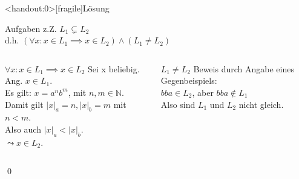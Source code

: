{
\begin{frame}<handout:0>[fragile]{Lösung}
    \begin{alertblock}{Aufgaben}
    z.Z. $L_1 \subsetneq L_2$\\
    d.h. $(\forall x: x \in L_1 \implies x \in L_2) \wedge (L_1 \neq L_2)$
    \end{alertblock}
    
    \begin{columns}
    \begin{alertblock}{$\forall x: x \in L_1 \implies x \in L_2$}
        Sei x beliebig. Ang. $x \in L_1$.\\
        Es gilt: $x=a^{n}b^{m}$, mit $n,m\in\mathbb{N}$.\\
        Damit gilt $|x|_a=n, |x|_b=m$ mit $n<m$.\\
        Also auch $|x|_a < |x|_b$.\\
        $\leadsto x \in L_2$.
    \end{alertblock}
    
    \begin{alertblock}{$L_1 \neq L_2$}
        Beweis durch Angabe eines Gegenbeispiels:\\
        $bba \in L_2$, aber $bba \notin L_1$\\
        Also sind $L_1$ und $L_2$ nicht gleich.
    \end{alertblock}
    \end{columns}
    \qed
\end{frame}
}

